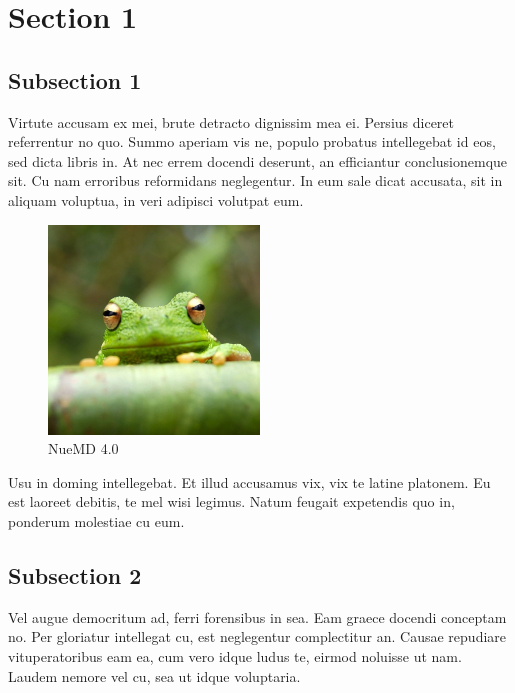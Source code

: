\section{Section 1}
\label{sec:examples}

\subsection{Subsection 1}

Virtute accusam ex mei, brute detracto dignissim mea ei. Persius diceret referrentur no quo. Summo aperiam vis ne, populo probatus intellegebat id eos, sed dicta libris in. At nec errem docendi deserunt, an efficiantur conclusionemque sit. Cu nam erroribus reformidans neglegentur. In eum sale dicat accusata, sit in aliquam voluptua, in veri adipisci volutpat eum.

\begin{figure}[!hbt]
\centering
\includegraphics[width=0.5\textwidth]{frog.jpg}
\caption{\label{fig:frog}NueMD 4.0}
\end{figure}

Usu in doming intellegebat. Et illud accusamus vix, vix te latine platonem. Eu est laoreet debitis, te mel wisi legimus. Natum feugait expetendis quo in, ponderum molestiae cu eum.

\subsection{Subsection 2}

Vel augue democritum ad, ferri forensibus in sea. Eam graece docendi conceptam no. Per gloriatur intellegat cu, est neglegentur complectitur an. Causae repudiare vituperatoribus eam ea, cum vero idque ludus te, eirmod noluisse ut nam. Laudem nemore vel cu, sea ut idque voluptaria.

